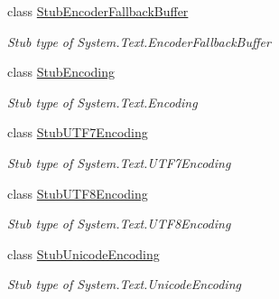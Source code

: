 \begin{DoxyCompactItemize}
class \hyperlink{class_system_1_1_text_1_1_fakes_1_1_stub_encoder_fallback_buffer}{Stub\-Encoder\-Fallback\-Buffer}
\begin{DoxyCompactList}\small\item\em Stub type of System.\-Text.\-Encoder\-Fallback\-Buffer\end{DoxyCompactList}\item 
class \hyperlink{class_system_1_1_text_1_1_fakes_1_1_stub_encoding}{Stub\-Encoding}
\begin{DoxyCompactList}\small\item\em Stub type of System.\-Text.\-Encoding\end{DoxyCompactList}\item 
class \hyperlink{class_system_1_1_text_1_1_fakes_1_1_stub_u_t_f7_encoding}{Stub\-U\-T\-F7\-Encoding}
\begin{DoxyCompactList}\small\item\em Stub type of System.\-Text.\-U\-T\-F7\-Encoding\end{DoxyCompactList}\item 
class \hyperlink{class_system_1_1_text_1_1_fakes_1_1_stub_u_t_f8_encoding}{Stub\-U\-T\-F8\-Encoding}
\begin{DoxyCompactList}\small\item\em Stub type of System.\-Text.\-U\-T\-F8\-Encoding\end{DoxyCompactList}\item 
class \hyperlink{class_system_1_1_text_1_1_fakes_1_1_stub_unicode_encoding}{Stub\-Unicode\-Encoding}
\begin{DoxyCompactList}\small\item\em Stub type of System.\-Text.\-Unicode\-Encoding\end{DoxyCompactList}\end{DoxyCompactItemize}
